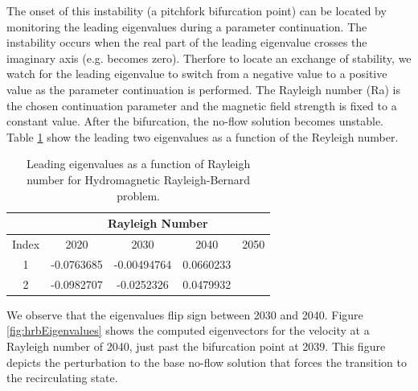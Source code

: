 \documentclass[pdf,ps2pdf,11pt]{SANDreport}
\begin{document}
The onset of this instability (a pitchfork bifurcation point) can be
located by monitoring the leading eigenvalues during a parameter
continuation.  The instability occurs when the real part of the
leading eigenvalue crosses the imaginary axis (e.g. becomes zero).
Therfore to locate an exchange of stability, we watch for the leading
eigenvalue to switch from a negative value to a positive value as the
parameter continuation is performed. The Rayleigh number (Ra) is the
chosen continuation parameter and the magnetic field strength is fixed
to a constant value.  After the bifurcation, the no-flow solution
becomes unstable. Table \ref{table:hrbEigenvalues} show the leading
two eigenvalues as a function of the Reyleigh number.  
{\bsinglespace
\begin{table}
\caption[Leading eigenvalues as a function of Rayleigh number]{\label{table:hrbEigenvalues}
Leading eigenvalues as a function of Rayleigh number for Hydromagnetic Rayleigh-Bernard problem.}
\begin{center}
\begin{tabular}{|c|c|c|c|c|}
\hline 
\multicolumn{1}{|c|}{ } & 
\multicolumn{4}{|c|}{Rayleigh Number} \\
\hline
\multicolumn{1}{|c|}{Index} & 
\multicolumn{1}{c|}{2020} & 
\multicolumn{1}{c|}{2030} & 
\multicolumn{1}{c|}{2040} & 
\multicolumn{1}{c|}{2050} \\ 
\hline\hline
1 & -0.0763685 & -0.00494764 & 0.0660233 &    \\
2 & -0.0982707 & -0.0252326  & 0.0479932 &    \\
\hline
\end{tabular}
\end{center}
\end{table}
We observe that the eigenvalues flip sign between 2030 and 2040.
Figure \ref{fig:hrbEigenvalues} shows the computed eigenvectors for
the velocity at a Rayleigh number of 2040, just past the bifurcation
point at 2039.  This figure depicts the perturbation to the base
no-flow solution that forces the transition to the recirculating
state.

}
\end{document}
